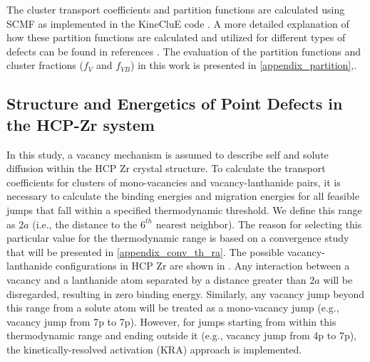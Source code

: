 \documentclass[preprint,12pt]{elsarticle}
\begin{document}
The cluster transport coefficients and partition functions are calculated using SCMF as implemented in the KineCluE code \cite{schuler_kineclue_2020}. A more detailed explanation of how these partition functions are calculated and utilized for different types of defects can be found in references \cite{messina_solute_2020, schuler_kineclue_2020}. 
The evaluation of the partition functions and cluster fractions ($f_V$ and $f_{VB}$) in this work is presented in \ref{appendix_partition},. 

\subsection{Structure and Energetics of Point Defects in the HCP-Zr system}

\FloatBarrier

In this study, a vacancy mechanism is assumed to describe self and solute diffusion within the HCP Zr crystal structure. To calculate the transport coefficients for clusters of mono-vacancies and vacancy-lanthanide pairs, it is necessary to calculate the binding energies and migration energies for all feasible jumps that fall within a specified thermodynamic threshold. We define this range as $2a$ (i.e., the distance to the $6^{th}$ nearest neighbor). The reason for selecting this particular value for the thermodynamic range is based on a convergence study that will be presented in \ref{appendix_conv_th_ra}. The possible vacancy-lanthanide configurations in HCP Zr are shown in . Any interaction between a vacancy and a lanthanide atom separated by a distance greater than $2a$  will be disregarded, resulting in zero binding energy. Similarly, any vacancy jump beyond this range from a solute atom will be treated as a mono-vacancy jump (e.g., vacancy jump from 7p to 7p). However, for jumps starting from within this thermodynamic range and ending outside it (e.g., vacancy jump from 4p to 7p), the kinetically-resolved activation (KRA) approach \cite{van_der_ven_first_2005} is implemented. 
\end{document}
